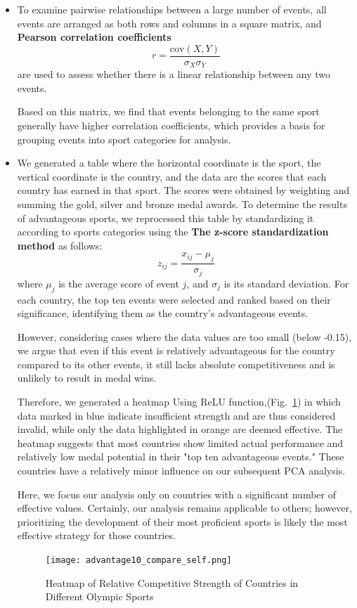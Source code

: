 \documentclass{mcmthesis}
\begin{document}
\begin{itemize}
\item[\bf STEP 1] {To examine pairwise relationships between a large number of events, all events are arranged as both rows and columns in a square matrix, and \textbf{Pearson correlation coefficients} 
\[r = \frac{\text{cov}(X, Y)}{\sigma_X \sigma_Y}\]
are used to assess whether there is a linear relationship between any two events.

Based on this matrix, we find that events belonging to the same sport generally have higher correlation coefficients, which provides a basis for grouping events into sport categories for analysis.}

\item[\bf STEP 2]{We generated a table where the horizontal coordinate is the sport, the vertical coordinate is the country, and the data are the scores that each country has earned in that sport. The scores were obtained by weighting and summing the gold, silver and bronze medal awards. To determine the results of advantageous sports, we reprocessed this table by standardizing it according to sports categories using the \textbf{The z-score standardization method} as follows:
\begin{equation}
z_{ij} = \frac{x_{ij} - \mu_j}{\sigma_j}
\end{equation}
where \( \mu_j \) is the average score of event \( j \), and \( \sigma_j \) is its standard deviation.
For each country, the top ten events were selected and ranked based on their significance, identifying them as the country's advantageous events.

However, considering cases where the data values are too small (below -0.15), we argue that even if this event is relatively advantageous for the country compared to its other events, it still lacks absolute competitiveness and is unlikely to result in medal wins.

Therefore, we generated a heatmap Using ReLU function,(Fig.~\ref{fig:advantage10_compare_self}) in which data marked in blue indicate insufficient strength and are thus considered invalid, while only the data highlighted in orange are deemed effective. The heatmap suggests that most countries show limited actual performance and relatively low medal potential in their "top ten advantageous events." These countries have a relatively minor influence on our subsequent PCA analysis.

Here, we focus our analysis only on countries with a significant number of effective values. Certainly, our analysis remains applicable to others; however, prioritizing the development of their most proficient sports is likely the most effective strategy for those countries.
}

\begin{figure}[h!]
    \centering
    \texttt{[image: advantage10\_compare\_self.png]}
    \caption{Heatmap of Relative Competitive Strength of Countries in Different Olympic Sports}
    \label{fig:advantage10_compare_self}
\end{figure}

\end{itemize}
\end{document}
